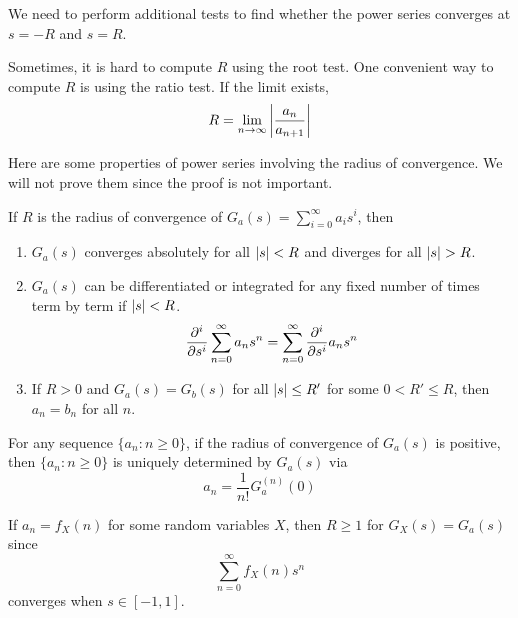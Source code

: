 \documentclass{huhtakm-template-book}
\begin{document}
    \begin{rem}
        We need to perform additional tests to find whether the power series converges at $s=-R$ and $s=R$.
    \end{rem}
    \begin{rem}
        Sometimes, it is hard to compute $R$ using the root test. One convenient way to compute $R$ is using the ratio test. If the limit exists,
        \begin{equation*}
            R=\lim_{n\to\infty}\left|{\frac{a_{n}}{a_{n+1}}}\right|
        \end{equation*}
    \end{rem}
    Here are some properties of power series involving the radius of convergence. We will not prove them since the proof is not important.
    \begin{thm}
        If $R$ is the radius of convergence of $G_{a}(s)=\sum_{i=0}^{\infty}a_{i}s^{i}$, then
        \begin{enumerate}
            \item $G_{a}(s)$ converges absolutely for all $\left|{s}\right|<R$ and diverges for all $\abs{s}>R$.
            \item $G_{a}(s)$ can be differentiated or integrated for any fixed number of times term by term if $\left|{s}\right|<R$.
            \begin{equation*}
                \pdv*[order={i}]{\sum_{n=0}^{\infty}a_{n}s^{n}}{s}=\sum_{n=0}^{\infty}\pdv*[order={i}]{a_{n}s^{n}}{s}
            \end{equation*}
            \item If $R>0$ and $G_{a}(s)=G_{b}(s)$ for all $\left|{s}\right|\leq R'$ for some $0<R'\leq R$, then $a_{n}=b_{n}$ for all $n$.
        \end{enumerate}
    \end{thm}
    \begin{rem}
        For any sequence $\{a_{n}:n\geq 0\}$, if the radius of convergence of $G_{a}(s)$ is positive, then $\{a_{n}:n\geq 0\}$ is uniquely determined by $G_{a}(s)$ via
        \begin{equation*}
            a_{n}=\frac{1}{n!}G_{a}^{(n)}(0)
        \end{equation*}
    \end{rem}
    \begin{rem}
        If $a_{n}=f_{X}(n)$ for some random variables $X$, then $R\geq 1$ for $G_{X}(s)=G_{a}(s)$ since
        \begin{equation*}
            \sum_{n=0}^{\infty}f_{X}(n)s^{n}
        \end{equation*}
        converges when $s\in[-1,1]$.
    \end{rem}
\end{document}
